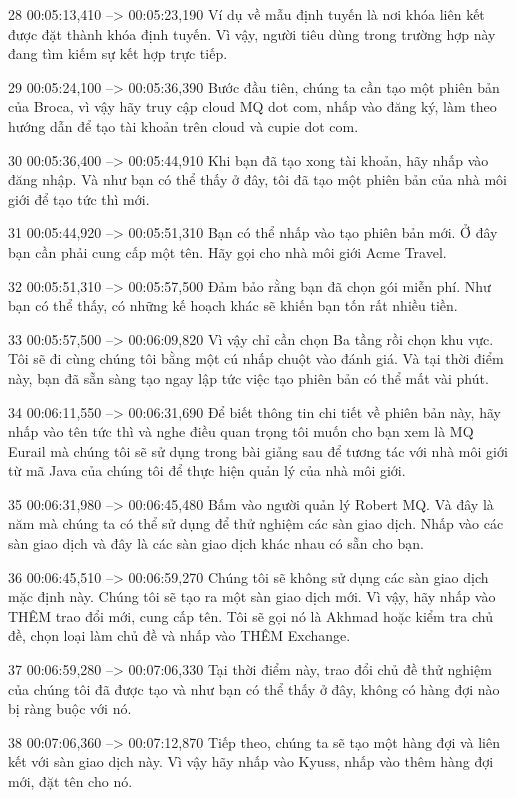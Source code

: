28
00:05:13,410 --> 00:05:23,190
Ví dụ về mẫu định tuyến là nơi khóa liên kết được đặt thành khóa định tuyến.  Vì vậy, người tiêu dùng trong trường hợp này đang tìm kiếm sự kết hợp trực tiếp.

29
00:05:24,100 --> 00:05:36,390
Bước đầu tiên, chúng ta cần tạo một phiên bản của Broca, vì vậy hãy truy cập cloud MQ dot com, nhấp vào đăng ký, làm theo hướng dẫn để tạo tài khoản trên cloud và cupie dot com.

30
00:05:36,400 --> 00:05:44,910
Khi bạn đã tạo xong tài khoản, hãy nhấp vào đăng nhập.  Và như bạn có thể thấy ở đây, tôi đã tạo một phiên bản của nhà môi giới để tạo tức thì mới.

31
00:05:44,920 --> 00:05:51,310
Bạn có thể nhấp vào tạo phiên bản mới.  Ở đây bạn cần phải cung cấp một tên.  Hãy gọi cho nhà môi giới Acme Travel.

32
00:05:51,310 --> 00:05:57,500
Đảm bảo rằng bạn đã chọn gói miễn phí.  Như bạn có thể thấy, có những kế hoạch khác sẽ khiến bạn tốn rất nhiều tiền.

33
00:05:57,500 --> 00:06:09,820
Vì vậy chỉ cần chọn Ba tầng rồi chọn khu vực.  Tôi sẽ đi cùng chúng tôi bằng một cú nhấp chuột vào đánh giá.  Và tại thời điểm này, bạn đã sẵn sàng tạo ngay lập tức việc tạo phiên bản có thể mất vài phút.

34
00:06:11,550 --> 00:06:31,690
Để biết thông tin chi tiết về phiên bản này, hãy nhấp vào tên tức thì và nghe điều quan trọng tôi muốn cho bạn xem là MQ Eurail mà chúng tôi sẽ sử dụng trong bài giảng sau để tương tác với nhà môi giới từ mã Java của chúng tôi để thực hiện  quản lý của nhà môi giới.

35
00:06:31,980 --> 00:06:45,480
Bấm vào người quản lý Robert MQ.  Và đây là năm mà chúng ta có thể sử dụng để thử nghiệm các sàn giao dịch.  Nhấp vào các sàn giao dịch và đây là các sàn giao dịch khác nhau có sẵn cho bạn.

36
00:06:45,510 --> 00:06:59,270
Chúng tôi sẽ không sử dụng các sàn giao dịch mặc định này.  Chúng tôi sẽ tạo ra một sàn giao dịch mới.  Vì vậy, hãy nhấp vào THÊM trao đổi mới, cung cấp tên. Tôi sẽ gọi nó là Akhmad hoặc kiểm tra chủ đề, chọn loại làm chủ đề và nhấp vào THÊM Exchange.

37
00:06:59,280 --> 00:07:06,330
Tại thời điểm này, trao đổi chủ đề thử nghiệm của chúng tôi đã được tạo và như bạn có thể thấy ở đây, không có hàng đợi nào bị ràng buộc với nó.

38
00:07:06,360 --> 00:07:12,870
Tiếp theo, chúng ta sẽ tạo một hàng đợi và liên kết với sàn giao dịch này.  Vì vậy hãy nhấp vào Kyuss, nhấp vào thêm hàng đợi mới, đặt tên cho nó.

